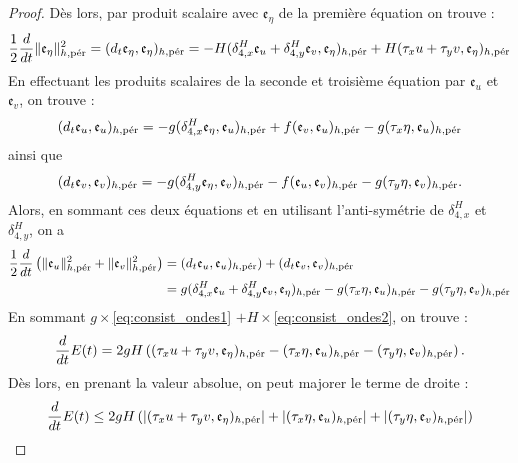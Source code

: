 \begin{proof}
Dès lors, par produit scalaire avec $\mathfrak{e}_{\eta}$ de la première équation on trouve :
\begin{equation}
\dfrac{1}{2} \dfrac{d}{dt} \| \mathfrak{e}_{\eta} \|_{h,\per}^2 = (d_t \mathfrak{e}_{\eta}, \mathfrak{e}_{\eta})_{h,\per} = - H ( \delta_{4,x}^H \mathfrak{e}_{u} + \delta_{4,y}^H \mathfrak{e}_{v}, \mathfrak{e}_{\eta})_{h,\per}  + H ( \tau_x u + \tau_y v, \mathfrak{e}_{\eta})_{h,\per}
\label{eq:consist_ondes1}
\end{equation}
En effectuant les produits scalaires de la seconde et troisième équation par $\mathfrak{e}_u$ et $\mathfrak{e}_v$, on trouve :
\begin{equation}
(d_t \mathfrak{e}_u, \mathfrak{e}_u)_{h,\per} = - g (\delta_{4,x}^H \mathfrak{e}_{\eta}, \mathfrak{e}_u)_{h,\per} + f(\mathfrak{e}_v, \mathfrak{e}_u)_{h,\per} - g(\tau_x \eta, \mathfrak{e}_u)_{h,\per}
\end{equation}
ainsi que 
\begin{equation}
(d_t \mathfrak{e}_v, \mathfrak{e}_v)_{h,\per} = - g (\delta_{4,y}^H \mathfrak{e}_{\eta}, \mathfrak{e}_v)_{h,\per} - f(\mathfrak{e}_u, \mathfrak{e}_v)_{h,\per} - g(\tau_y \eta, \mathfrak{e}_v)_{h,\per}.
\end{equation}
Alors, en sommant ces deux équations et en utilisant l’anti-symétrie de $\delta_{4,x}^H$ et $\delta_{4,y}^H$, on a
\begin{align}
\dfrac{1}{2} \dfrac{d}{dt} \left( \| \mathfrak{e}_{u} \|_{h,\per}^2 + \| \mathfrak{e}_{v} \|_{h,\per}^2 \right) & = (d_t \mathfrak{e}_u, \mathfrak{e}_u)_{h,\per}) + (d_t \mathfrak{e}_v, \mathfrak{e}_v)_{h,\per} \\
& = g (\delta_{4,x}^H \mathfrak{e}_u + \delta_{4,y}^H \mathfrak{e}_v, \mathfrak{e}_{\eta})_{h,\per} - g(\tau_x \eta, \mathfrak{e}_u)_{h,\per} - g(\tau_y \eta, \mathfrak{e}_v)_{h,\per}
\label{eq:consist_ondes2}
\end{align}
En sommant $g \times $\eqref{eq:consist_ondes1} $+ H \times$\eqref{eq:consist_ondes2}, on trouve :
\begin{equation}
\dfrac{d}{dt} E(t) = 2 g H \left( (\tau_x u + \tau_y v, \mathfrak{e}_{\eta})_{h,\per} - (\tau_x \eta, \mathfrak{e}_u )_{h,\per} - (\tau_y \eta, \mathfrak{e}_v )_{h,\per} \right).
\end{equation}
Dès lors, en prenant la valeur absolue, on peut majorer le terme de droite :
\begin{equation}
\dfrac{d}{dt} E(t) \leq 2 g H \left( |(\tau_x u + \tau_y v, \mathfrak{e}_{\eta})_{h,\per}| + |(\tau_x \eta, \mathfrak{e}_u )_{h,\per}| + |(\tau_y \eta, \mathfrak{e}_v )_{h,\per}|  \right)

\end{equation}
\end{proof}
